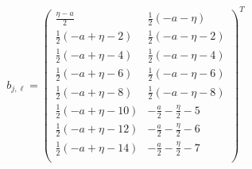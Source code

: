 \documentclass[preview]{standalone}
\begin{document}
\begin{align*}
  b_{j,\ell} = 
  \left(
\begin{array}{cc}
 \frac{\eta -a}{2} & \frac{1}{2} (-a-\eta ) \\
 \frac{1}{2} (-a+\eta -2) & \frac{1}{2} (-a-\eta -2) \\
 \frac{1}{2} (-a+\eta -4) & \frac{1}{2} (-a-\eta -4) \\
 \frac{1}{2} (-a+\eta -6) & \frac{1}{2} (-a-\eta -6) \\
 \frac{1}{2} (-a+\eta -8) & \frac{1}{2} (-a-\eta -8) \\
 \frac{1}{2} (-a+\eta -10) & -\frac{a}{2}-\frac{\eta }{2}-5 \\
 \frac{1}{2} (-a+\eta -12) & -\frac{a}{2}-\frac{\eta }{2}-6 \\
 \frac{1}{2} (-a+\eta -14) & -\frac{a}{2}-\frac{\eta }{2}-7 \\
\end{array}
\right)^T 
\end{align*}
\end{document}
